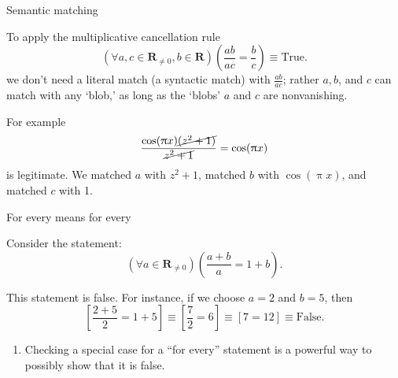 \documentclass[portrait,fleqn,12pt]{beamer}
\newcommand{\reals}{\mathbf{R}}
\newenvironment{handlist}
   {\begin{enumerate}[\faHandPointRight]
       \addtolength{\itemsep}{0.0\itemsep}}
     {\end{enumerate}}
\begin{document}
\begin{frame}{Semantic matching}

To apply the multiplicative cancellation rule
\begin{equation*} 
   \left(\forall a, c\in \reals_{\neq 0}, b \in \reals \right)\left(\frac{a b}{a c} = \frac{b}{c} \right) \equiv \text{True}.
  \end{equation*}
 we don't need a literal match (a syntactic match) with $\frac{a b}{a c}$; rather $a,b$, and $c$ can match with any `blob,'  as long as
 the `blobs'  $a$ and $c$ are nonvanishing.
 
For example
\begin{equation*}
   \frac{ \cos(\uppi x) \cancel{ (z^2 + 1)}}{ \cancel{z^2 + 1} } =  \cos(\uppi x)
\end{equation*}
is legitimate.  We matched $a$ with $z^2 + 1$,  matched $b$ with $ \cos(\uppi x) $, and matched $c$ with 1.


\end{frame}

\begin{frame}{For every means for every}

Consider the statement:
\begin{equation*}
  \left(\forall a \in \reals_{\neq 0} \right)\left(\frac{a+b}{a} = 1 + b \right).
\end{equation*}

This statement is false. For instance, if we choose $a=2$ and $b=5$, then
\begin{equation*}
    \left[ \frac{2+5}{2} = 1+5 \right] \equiv   \left[ \frac{7}{2} = 6 \right]  \equiv \left[ 7 = 12\right]  \equiv \text{False}.
\end{equation*}

\begin{handlist}
\item Checking a special case for a ``for every''  statement is a powerful way to possibly show that it is false.
\end{handlist}

\end{frame}
\end{document}
